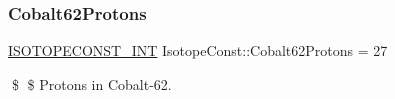 \subsubsection{\texorpdfstring{Cobalt62\+Protons}{Cobalt62Protons}}
{\footnotesize\ttfamily \mbox{\hyperlink{group___isotope_const-_macros_ga5f18360b3e99483a35c32d789e62621c}{I\+S\+O\+T\+O\+P\+E\+C\+O\+N\+S\+T\+\_\+\+I\+NT}} Isotope\+Const\+::\+Cobalt62\+Protons = 27}

\$ \$ Protons in Cobalt-\/62. 